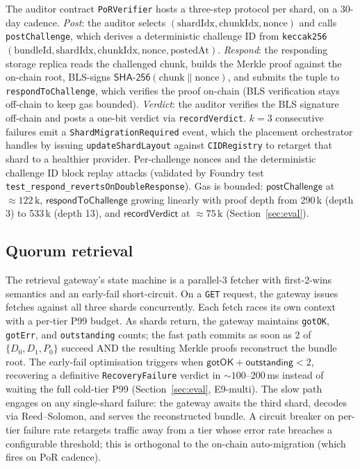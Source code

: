 The auditor contract \texttt{PoRVerifier} hosts a three-step protocol per shard, on a 30-day cadence. \emph{Post}: the auditor selects \((\text{shardIdx}, \text{chunkIdx}, \text{nonce})\) and calls \texttt{postChallenge}, which derives a deterministic challenge ID from \texttt{keccak256}\((\text{bundleId}, \text{shardIdx}, \text{chunkIdx}, \text{nonce}, \text{postedAt})\). \emph{Respond}: the responding storage replica reads the challenged chunk, builds the Merkle proof against the on-chain root, BLS-signs \(\textsf{SHA-256}(\text{chunk} \mathbin{\|} \text{nonce})\), and submits the tuple to \texttt{respondToChallenge}, which verifies the proof on-chain (BLS verification stays off-chain to keep gas bounded). \emph{Verdict}: the auditor verifies the BLS signature off-chain and posts a one-bit verdict via \texttt{recordVerdict}. \(k = 3\) consecutive failures emit a \texttt{ShardMigrationRequired} event, which the placement orchestrator handles by issuing \texttt{updateShardLayout} against \texttt{CIDRegistry} to retarget that shard to a healthier provider. Per-challenge nonces and the deterministic challenge ID block replay attacks (validated by Foundry test \texttt{test\_respond\_revertsOnDoubleResponse}). Gas is bounded: \(\textsf{postChallenge}\) at \(\approx 122\,\text{k}\), \(\textsf{respondToChallenge}\) growing linearly with proof depth from 290\,k (depth 3) to 533\,k (depth 13), and \(\textsf{recordVerdict}\) at \(\approx 75\,\text{k}\) (Section~\ref{sec:eval}).

\subsection{Quorum retrieval}
\label{sec:protocol:retrieval}

The retrieval gateway's state machine is a parallel-3 fetcher with first-2-wins semantics and an early-fail short-circuit. On a \texttt{GET} request, the gateway issues fetches against all three shards concurrently. Each fetch races its own context with a per-tier P99 budget. As shards return, the gateway maintains \texttt{gotOK}, \texttt{gotErr}, and \texttt{outstanding} counts; the fast path commits as soon as 2 of \(\{D_0, D_1, P_0\}\) succeed AND the resulting Merkle proofs reconstruct the bundle root. The early-fail optimisation triggers when \(\textsf{gotOK} + \textsf{outstanding} < 2\), recovering a definitive \texttt{RecoveryFailure} verdict in $\sim 100$--$200$\,ms instead of waiting the full cold-tier P99 (Section~\ref{sec:eval}, E9-multi). The slow path engages on any single-shard failure: the gateway awaits the third shard, decodes via Reed--Solomon, and serves the reconstructed bundle. A circuit breaker on per-tier failure rate retargets traffic away from a tier whose error rate breaches a configurable threshold; this is orthogonal to the on-chain auto-migration (which fires on PoR cadence).


